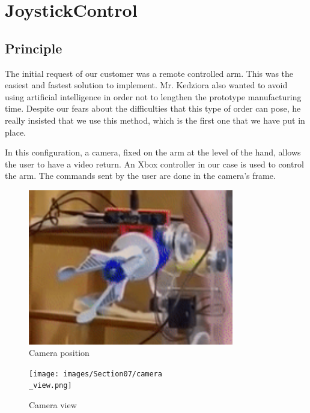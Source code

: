\section{JoystickControl}\insertloftspace
\setcounter{figure}{0}\setcounter{table}{0}

\subsection{Principle}

The initial request of our customer was a remote controlled arm. This was the easiest and fastest solution to implement. Mr. Kedziora also wanted to avoid using artificial intelligence in order not to lengthen the prototype manufacturing time. Despite our fears about the difficulties that this type of order can pose, he really insisted that we use this method, which is the first one that we have put in place.

\bigbreak
In this configuration, a camera, fixed on the arm at the level of the hand, allows the user to have a video return. An Xbox controller in our case is used to control the arm. The commands sent by the user are done in the camera's frame.

\begin{figure}[ht]
    \centering
    \includegraphics[width=0.8\textwidth]{images/Section07/camera.png}
    \caption{Camera position}
    \label{fig:mesh16}
\end{figure}
\FloatBarrier

\begin{figure}[ht]
    \centering
    \texttt{[image: images/Section07/camera\\\_view.png]}
    \caption{Camera view}
    \label{fig:mesh17}
\end{figure}
\FloatBarrier

